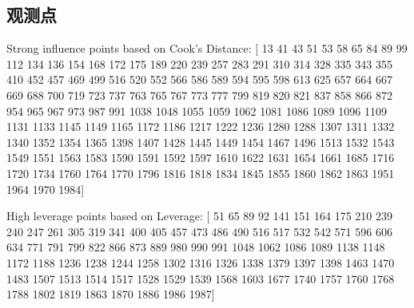 \documentclass[UTF8,ctexart,a4paper,11pt,openany]{article}
\theoremstyle{definition}
\begin{document}
\subsection{观测点}
Strong influence points based on Cook's Distance: [  13   41   43   51   53   58   65   84   89   99  112  134  136  154
  168  172  175  189  220  239  257  283  291  310  314  328  335  343
  355  410  452  457  469  499  516  520  552  566  586  589  594  595
  598  613  625  657  664  667  669  688  700  719  723  737  763  765
  767  773  777  799  819  820  821  837  858  866  872  954  965  967
  973  987  991 1038 1048 1055 1059 1062 1081 1086 1089 1096 1109 1131
 1133 1145 1149 1165 1172 1186 1217 1222 1236 1280 1288 1307 1311 1332
 1340 1352 1354 1365 1398 1407 1428 1445 1449 1454 1467 1496 1513 1532
 1543 1549 1551 1563 1583 1590 1591 1592 1597 1610 1622 1631 1654 1661
 1685 1716 1720 1734 1760 1764 1770 1796 1816 1818 1834 1845 1855 1860
 1862 1863 1951 1964 1970 1984]\par
High leverage points based on Leverage: [  51   65   89   92  141  151  164  175  210  239  240  247  261  305
  319  341  400  405  457  473  486  490  516  517  532  542  571  596
  606  634  771  791  799  822  866  873  889  980  990  991 1048 1062
 1086 1089 1138 1148 1172 1188 1236 1238 1244 1258 1302 1316 1326 1338
 1379 1397 1398 1463 1470 1483 1507 1513 1514 1517 1528 1529 1539 1568
 1603 1677 1740 1757 1760 1768 1788 1802 1819 1863 1870 1886 1986 1987]



    
\end{document}
